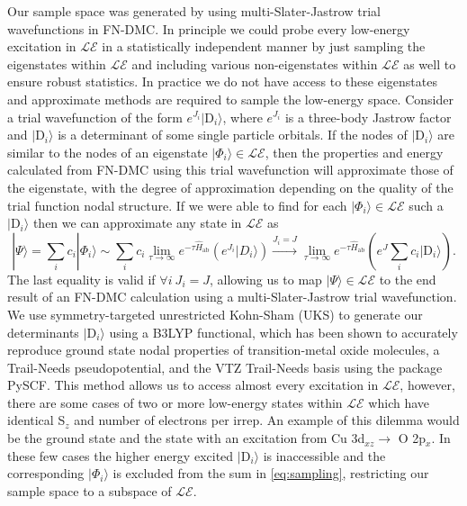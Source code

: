\documentclass[12pt]{article}
\begin{document}
Our sample space was generated by using multi-Slater-Jastrow trial wavefunctions in FN-DMC. 
In principle we could probe every low-energy excitation in $\mathcal{LE}$ in a statistically independent manner by just sampling the eigenstates within $\mathcal{LE}$ and including various non-eigenstates within $\mathcal{LE}$ as well to ensure robust statistics.
In practice we do not have access to these eigenstates and approximate methods are required to sample the low-energy space. 
Consider a trial wavefunction of the form $e^{J_i} |\text{D}_i\rangle$, where $e^{J_i}$ is a three-body Jastrow factor and $|\text{D}_i\rangle$ is a determinant of some single particle orbitals.
If the nodes of $|\text{D}_i\rangle$ are similar to the nodes of an eigenstate $|\Phi_i\rangle \in \mathcal{LE}$, then the properties and energy calculated from FN-DMC using this trial wavefunction will approximate those of the eigenstate, with the degree of approximation depending on the quality of the trial function nodal structure.
If we were able to find for each $|\Phi_i \rangle \in \mathcal{LE}$ such a $|\text{D}_i\rangle$ then we can approximate any state in $\mathcal{LE}$ as
\begin{equation}
|\Psi\rangle = \sum_i c_i |\Phi_i\rangle \sim \sum_i c_i \lim_{\tau \rightarrow \infty} e^{-\tau \hat{H}_\text{ab}} (e^{J_i} |D_i\rangle) \xrightarrow{J_i = J} \lim_{\tau \rightarrow \infty} e^{-\tau \hat{H}_\text{ab}} (e^{J}\sum_{i} c_i|\text{D}_i\rangle).
\label{eq:sampling}
\end{equation}
The last equality is valid if $\forall i\  J_i = J$, allowing us to map $|\Psi \rangle \in \mathcal{LE}$ to the end result of an FN-DMC calculation using a multi-Slater-Jastrow trial wavefunction. 
We use symmetry-targeted unrestricted Kohn-Sham (UKS) to generate our determinants $|\text{D}_i\rangle$ using a B3LYP functional, which has been shown to accurately reproduce ground state nodal properties of transition-metal oxide molecules, a Trail-Needs pseudopotential, and the VTZ Trail-Needs basis using the package PySCF.
This method allows us to access almost every excitation in $\mathcal{LE}$, however, there are some cases of two or more low-energy states within $\mathcal{LE}$ which have identical S$_z$ and number of electrons per irrep.
An example of this dilemma would be the ground state and the state with an excitation from Cu 3d$_{xz} \rightarrow $  O 2p$_x$.
In these few cases the higher energy excited $|\text{D}_i\rangle$ is inaccessible and the corresponding $|\Phi_i\rangle$ is excluded from the sum in \eqref{eq:sampling}, restricting our sample space to a subspace of $\mathcal{LE}$.
\end{document}
